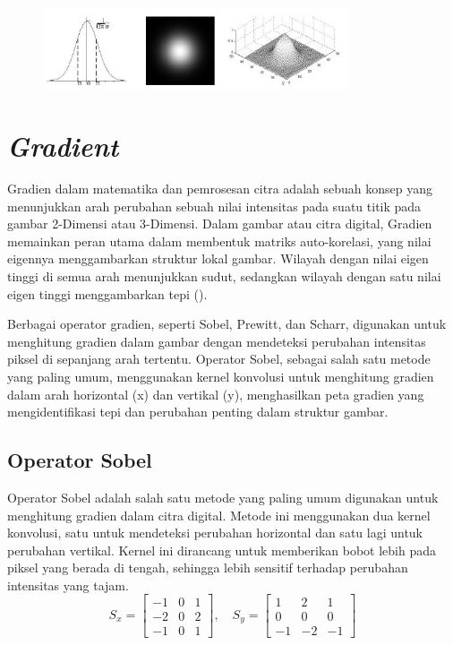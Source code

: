 \begin{figure}
  \centering{}
  \includegraphics[width=0.8\textwidth]{gambar/Uniform Gaussian kernel.jpg}
  \caption{}
\end{figure}

\section{\emph{Gradient}}
  Gradien dalam matematika dan pemrosesan citra adalah sebuah konsep yang menunjukkan arah perubahan sebuah nilai intensitas pada suatu titik pada gambar 2-Dimensi atau 3-Dimensi. 
Dalam gambar atau citra digital, Gradien memainkan peran utama dalam membentuk matriks auto-korelasi, yang nilai eigennya menggambarkan struktur lokal gambar. 
Wilayah dengan nilai eigen tinggi di semua arah menunjukkan sudut, sedangkan wilayah dengan satu nilai eigen tinggi menggambarkan tepi (\cite[hlm. 305--306]{Sanchez2018}).

  Berbagai operator gradien, seperti Sobel, Prewitt, dan Scharr, digunakan untuk menghitung gradien dalam gambar dengan mendeteksi perubahan intensitas piksel di sepanjang arah tertentu. 
Operator Sobel, sebagai salah satu metode yang paling umum, menggunakan kernel konvolusi untuk menghitung gradien dalam arah horizontal (x) dan vertikal (y), menghasilkan peta gradien yang mengidentifikasi tepi dan perubahan penting dalam struktur gambar.
\subsection{Operator Sobel}
  Operator Sobel adalah salah satu metode yang paling umum digunakan untuk menghitung gradien dalam citra digital. Metode ini menggunakan dua kernel konvolusi, satu untuk mendeteksi perubahan horizontal dan satu lagi untuk perubahan vertikal. Kernel ini dirancang untuk memberikan bobot lebih pada piksel yang berada di tengah, sehingga lebih sensitif terhadap perubahan intensitas yang tajam.
\begin{equation}
  S_x = \begin{bmatrix}
    -1 & 0 & 1 \\
    -2 & 0 & 2 \\
    -1 & 0 & 1
  \end{bmatrix}, \quad
  S_y = \begin{bmatrix}
    1 & 2 & 1 \\
    0 & 0 & 0 \\
    -1 & -2 & -1
  \end{bmatrix}
\end{equation}

